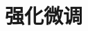 \setcounter{chapter}{16}

\hypertarget{ux5f3aux5316ux5faeux8c03}{%
\chapter{强化微调}\label{ux5f3aux5316ux5faeux8c03}}
